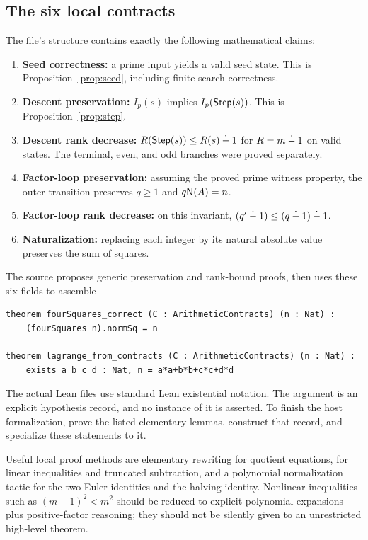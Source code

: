 \subsection{The six local contracts}

The file's  structure contains exactly the
following mathematical claims:
\begin{enumerate}
\item \textbf{Seed correctness:} a prime input yields a valid seed state.
This is Proposition~\ref{prop:seed}, including finite-search correctness.
\item \textbf{Descent preservation:} $I_p(s)$ implies $I_p(\mathsf{Step}(s))$.
This is Proposition~\ref{prop:step}.
\item \textbf{Descent rank decrease:}
$R(\mathsf{Step}(s))\le R(s)\mathbin{\dot{-}}1$ for $R=m\mathbin{\dot{-}}1$ on valid states.
The terminal, even, and odd branches were proved separately.
\item \textbf{Factor-loop preservation:} assuming the proved prime witness
property, the outer transition preserves
$q\ge1$ and $q\mathsf N(A)=n$.
\item \textbf{Factor-loop rank decrease:} on this invariant,
$(q'\mathbin{\dot{-}}1)\le(q\mathbin{\dot{-}}1)\mathbin{\dot{-}}1$.
\item \textbf{Naturalization:} replacing each integer by its natural
absolute value preserves the sum of squares.
\end{enumerate}

The source proposes generic preservation and rank-bound proofs, then uses
these six fields to assemble
\begin{lstlisting}
theorem fourSquares_correct (C : ArithmeticContracts) (n : Nat) :
    (fourSquares n).normSq = n

theorem lagrange_from_contracts (C : ArithmeticContracts) (n : Nat) :
    exists a b c d : Nat, n = a*a+b*b+c*c+d*d
\end{lstlisting}
The actual Lean files use standard Lean existential notation. The argument
 is an explicit hypothesis record, and no instance of it is asserted.
To finish the host formalization, prove the listed elementary lemmas,
construct that record, and specialize these statements to it.

Useful local proof methods are elementary rewriting for quotient equations,
 for linear inequalities and truncated subtraction, and a
polynomial normalization tactic for the two Euler identities and the
halving identity. Nonlinear inequalities such as
$(m-1)^2<m^2$ should be reduced to explicit polynomial expansions plus
positive-factor reasoning; they should not be silently given to an
unrestricted high-level theorem.

